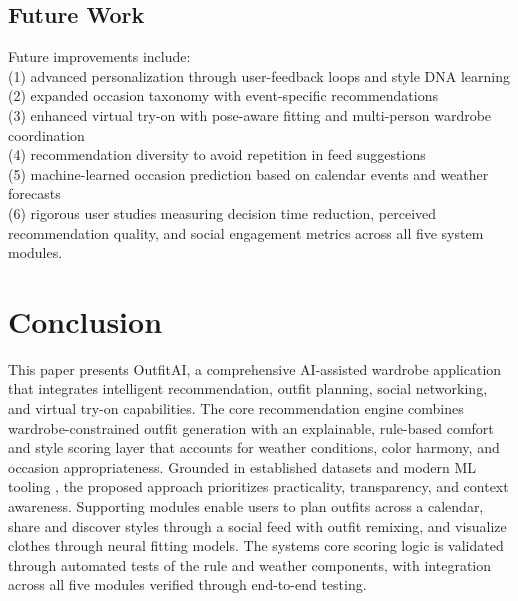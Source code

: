 \documentclass[stu,man]{apa7}
\begin{document}
\subsection{Future Work}
Future improvements include: \\(1) advanced personalization through user-feedback loops and style DNA learning\\ (2) expanded occasion taxonomy with event-specific recommendations\\ (3) enhanced virtual try-on with pose-aware fitting and multi-person wardrobe coordination\\ (4) recommendation diversity to avoid repetition in feed suggestions\\ (5) machine-learned occasion prediction based on calendar events and weather forecasts\\ (6) rigorous user studies measuring decision time reduction, perceived recommendation quality, and social engagement metrics across all five system modules.
\section{Conclusion}
This paper presents OutfitAI, a comprehensive AI-assisted wardrobe application that integrates intelligent recommendation, outfit planning, social networking, and virtual try-on capabilities.
The core recommendation engine combines wardrobe-constrained outfit generation with an explainable, rule-based comfort and style scoring layer that accounts for weather conditions, color harmony, and occasion appropriateness.
Grounded in established datasets and modern ML tooling \parencite{liuLQWTcvpr16DeepFashion,abadi2016tensorflow,pedregosa2011scikit}, the proposed approach prioritizes practicality, transparency, and context awareness.
Supporting modules enable users to plan outfits across a calendar, share and discover styles through a social feed with outfit remixing, and visualize clothes through neural fitting models.
The system\textquotesingle s core scoring logic is validated through automated tests of the rule and weather components, with integration across all five modules verified through end-to-end testing.

\printbibliography
\end{document}
